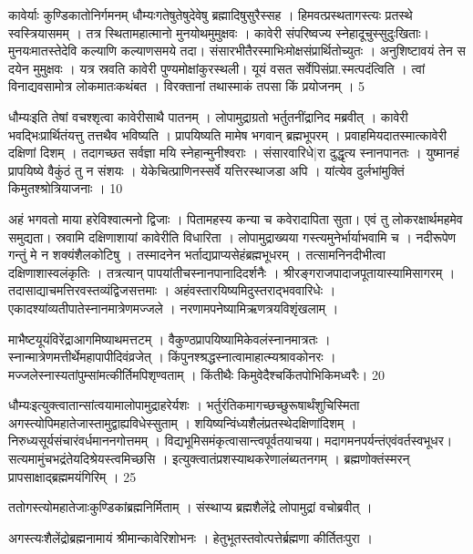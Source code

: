 कावेर्याः कुण्डिकातोनिर्गमनम् धौम्यःगतेषुतेषुदेवेषु ब्रह्मादिषुसुरैस्सह ।
हिमवत्प्रस्थतागस्त्यः प्रतस्थे स्वस्त्रियासमम् ।
तत्र स्थितामहात्मानो मुनयोथमुमुक्षवः ।
कावेरी संपरिष्वज्य स्नेहादूचुस्सुदुःखिताः।
मुनयःमातस्तेदेवि कल्याणि कल्याणसमये तदा।
संसारभीतैरस्माभिःमोक्षसंप्रार्थितोच्युतः ।
अनुशिष्टावयं तेन स दयेन मुमुक्षवः ।
यत्र स्रवति कावेरी पुण्यमोक्षांकुरस्थली।
यूयं वसत सर्वेपिसंप्रा.स्मत्पदंत्विति ।
त्वां विनाद्यवसामोत्र लोकमातःकथंबत ।
विरक्तानां तथास्माकं तपसा किं प्रयोजनम् ।
5

धौम्यःइति तेषां वचश्शृत्वा कावेरीसाथै पातनम् ।
लोपामुद्राग्रतो भर्तुतनींद्रानिद मब्रवीत् ।
कावेरी
भवद्भिःप्रार्थितंयत्तु तत्तथैव भविष्यति ।
प्रापयिष्यति मामेष भगवान् ब्रह्मभूपरम् ।
प्रवाहमियदातस्मात्कावेरी दक्षिणां दिशम् ।
तदागच्छत सर्वज्ञा मयि स्नेहान्मुनीश्वराः ।
संसारवारिधे|रा दुद्धृत्य स्नानपानतः ।
युष्मानहं प्रापयिष्ये वैकुंठं तु न संशयः ।
येकेचित्प्राणिनस्सर्वे यत्तिरस्थाजडा अपि ।
यांत्येव दुर्लभांमुक्तिं किमुतश्श्रोत्रियाजनाः ।
10

अहं भगवतो माया हरेविश्वात्मनो द्विजाः ।
पितामहस्य कन्या च कवेरादापिता सुता।
एवं तु लोकरक्षार्थमहमेव समुद्यता।
स्रवामि दक्षिणाशायां कावेरीति विधारिता ।
लोपामुद्राख्यया गस्त्यमुनेर्भार्याभवामि च ।
नदीरूपेण गन्तुं मे न शक्यंशैलकोटिषु ।
तस्मादनेन भर्ताद्यप्राप्यसेहंब्रह्मभूधरम् ।
तत्सामनिनदीभीत्वा दक्षिणाशास्वलंकृतिः ।
तत्रत्यान् पापयांतीचस्नानपानादिदर्शनैः ।
श्रीरङ्गराजपादाजपूतायास्यामिसागरम् ।
तदासाद्याचमत्तिरवस्तव्यंद्विजसत्तमाः ।
अहंवस्तारयिष्यमिदुस्तराद्भववारिधेः ।
एकादश्यांव्यतीपातेस्नानमात्रेणमज्जले ।
नरणामपनेष्यामिऋणत्रयविशृंखलाम् ।

माभैष्टयूयंविरेंद्राआगमिष्याथमत्तटम् ।
वैकुण्ठप्रापयिष्यामिकेवलंस्नानमात्रतः ।
स्नान्मात्रेणमत्तीर्थेमहापापीदिवंव्रजेत् ।
किंपुनश्श्रद्धस्नात्वामाहात्म्यश्रावकोनरः ।
मज्जलेस्नास्यतांपुम्सांमत्कीर्तिमपिशृण्वताम् ।
किंतीथैः किमुवेदैश्चकिंतपोभिकिमध्वरैः।
20

धौम्यःइत्युक्त्वातान्सांत्वयामालोपामुद्राहरेर्यशः ।
भर्तुरंतिकमागच्छच्छुरूषार्थंशुचिस्मिता अगस्त्योपिमहातेजास्तामुद्वाह्यविधेस्सुताम् ।
शयिष्यन्विंध्यशैलंप्रतस्थेदक्षिणांदिशम् ।
निरुध्यसूर्यसंचारंवर्धमाननगोत्तमम् ।
विद्यभूमिसमंकृत्वासान्त्वपूर्वतयाचया।
मदागमनपर्यन्तंएवंवर्तस्वभूधर।
सत्यमामुंचभद्रंतेयदिश्रेयस्त्वमिच्छसि ।
इत्युक्त्वातंप्रशस्याथकरेणालंब्यतनगम् ।
ब्रह्मणोक्तंस्मरन् प्रापसाक्षाद्ब्रह्ममयंगिरिम् ।
25

ततोगस्त्योमहातेजाःकुण्डिकांब्रह्मनिर्मिताम् ।
संस्थाप्य ब्रह्मशैलेंद्रे लोपामुद्रां वचोब्रवीत् ।

अगस्त्यःशैलेंद्रोब्रह्मनामायं श्रीमान्कावेरिशोभनः ।
हेतुभूतस्तवोत्पत्तेर्ब्रह्मणा कीर्तितःपुरा ।

